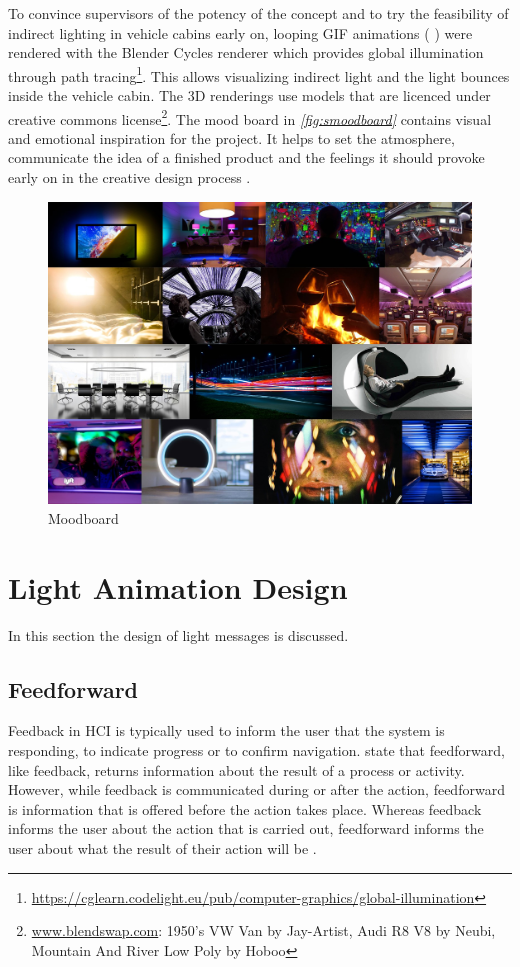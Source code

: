 To convince supervisors of the potency of the concept and to try the feasibility of indirect lighting in vehicle cabins early on, looping GIF animations ( \emph{}) were rendered with the Blender Cycles renderer which provides global illumination through path tracing\footnote{\url{https://cglearn.codelight.eu/pub/computer-graphics/global-illumination}}. This allows visualizing indirect light and the light bounces inside the vehicle cabin. The 3D renderings use models that are licenced under creative commons license\footnote{\url{www.blendswap.com}: 1950's VW Van by Jay-Artist, Audi R8 V8 by Neubi, Mountain And River Low Poly by Hoboo}. The mood board in \emph{\autoref{fig:smoodboard}} contains visual and emotional inspiration for the project. It helps to set the atmosphere, communicate the idea of a finished product and the feelings it should provoke early on in the creative design process \cite{Cassidy2011TheTool}.

\begin{figure}
\centering
    \includegraphics[width=1.\textwidth]{fig/moodboard_G.jpg}
    \caption[Moodboard]{Moodboard}
    \label{fig:smoodboard}
\end{figure}
\section{Light Animation Design}
\label{sec:Lightdesign}
In this section the design of light messages is discussed.

\subsection{Feedforward}
\label{ssec:feedforward}
Feedback in HCI is typically used to inform the user that the system is responding, to indicate progress or to confirm navigation. \citet{Djajadiningrat2002ButHow} state that feedforward, like feedback, returns information about the result of a process or activity. However, while feedback is communicated during or after the action, feedforward is information that is offered before the action takes place. Whereas feedback informs the user about the action that is carried out, feedforward informs the user about what the result of their action will be \citep{Vermeulen2013CrossingExecution}.

